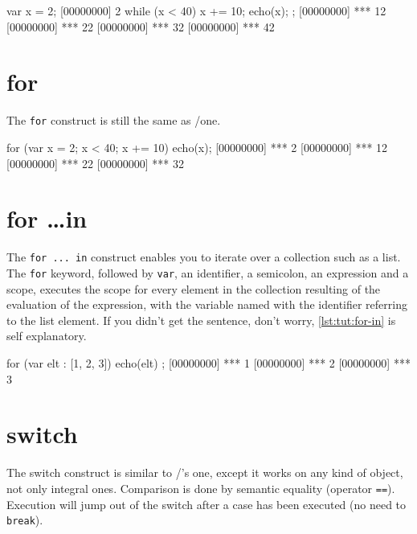 \begin{urbiscript}[caption=The \lstinline{while} construct,
label=lst:tut:while]
var x = 2;
[00000000] 2
while (x < 40)
{
  x += 10;
  echo(x);
};
[00000000] *** 12
[00000000] *** 22
[00000000] *** 32
[00000000] *** 42
\end{urbiscript}

\section{for}

The \lstinline{for} construct is still the same as \C/\Cxx one.

\begin{urbiscript}[caption=Nihil novi sub sole, label=lst:tut:for]
for (var x = 2; x < 40; x += 10)
  echo(x);
[00000000] *** 2
[00000000] *** 12
[00000000] *** 22
[00000000] *** 32
\end{urbiscript}

\section{for \ldots in}

The \lstinline{for ... in} construct enables you to iterate over a
collection such as a list. The \lstinline{for} keyword, followed by
\lstinline|var|, an identifier, a semicolon, an expression and a
scope, executes the scope for every element in the collection
resulting of the evaluation of the expression, with the variable named
with the identifier referring to the list element. If you didn't get
the sentence, don't worry, \autoref{lst:tut:for-in} is self explanatory.

\begin{urbiscript}[caption=Collection iteration with \lstinline{for},
label=lst:tut:for-in]
for (var elt : [1, 2, 3]) { echo(elt) };
[00000000] *** 1
[00000000] *** 2
[00000000] *** 3
\end{urbiscript}

\section{switch}

The switch construct is similar to \C/\Cxx's one, except it works on
any kind of object, not only integral ones. Comparison is done by
semantic equality (operator \lstinline{==}). Execution will jump out of
the switch after a case has been executed (no need to \lstinline{break}).

